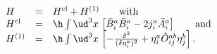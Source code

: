 \begin{equation}
\begin{array}{lcl}
H & = & H^{\text{cl}} + H^{(1)} \qquad \text{with} \\
H^{\text{cl}} & = & \h \int \ud^3 x \, \left[
\bar{B}_{i}^{a} \bar{B}_{i}^{a} - 2 j_i^a \bar{A}_{i}^{a} \right] \qquad
\text{and} \\
H^{(1)} & = & \h \int \ud^3 x \, \left[
-\frac{\delta^{2} }{(\delta \eta_{i}^{a} )^2 }
+\eta_{i}^{a} \hat{O}_{ij}^{ab} \eta_{j}^{b} \right].
\end{array}
\label{G3}
\end{equation}

